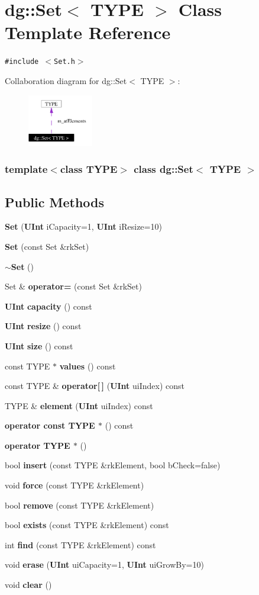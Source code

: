 \section{dg::Set$<$ TYPE $>$ Class Template Reference}
\label{classdg_1_1Set}
{\tt \#include $<$Set.h$>$}

Collaboration diagram for dg::Set$<$ TYPE $>$:\begin{figure}[H]
\begin{center}
\leavevmode
\includegraphics[width=81pt]{classdg_1_1Set__coll__graph}
\end{center}
\end{figure}
\subsubsection*{template$<$class TYPE$>$ class dg::Set$<$ TYPE $>$}

\subsection*{Public Methods}
\begin{CompactItemize}
\item 
{\bf Set} ({\bf UInt} i\-Capacity=1, {\bf UInt} i\-Resize=10)
\item 
{\bf Set} (const Set \&rk\-Set)
\item 
{\bf $\sim$Set} ()
\item 
Set \& {\bf operator=} (const Set \&rk\-Set)
\item 
{\bf UInt} {\bf capacity} () const
\item 
{\bf UInt} {\bf resize} () const
\item 
{\bf UInt} {\bf size} () const
\item 
const TYPE $\ast$ {\bf values} () const
\item 
const TYPE \& {\bf operator[$\,$]} ({\bf UInt} ui\-Index) const
\item 
TYPE \& {\bf element} ({\bf UInt} ui\-Index) const
\item 
{\bf operator const TYPE $\ast$} () const
\item 
{\bf operator TYPE $\ast$} ()
\item 
bool {\bf insert} (const TYPE \&rk\-Element, bool b\-Check=false)
\item 
void {\bf force} (const TYPE \&rk\-Element)
\item 
bool {\bf remove} (const TYPE \&rk\-Element)
\item 
bool {\bf exists} (const TYPE \&rk\-Element) const
\item 
int {\bf find} (const TYPE \&rk\-Element) const
\item 
void {\bf erase} ({\bf UInt} ui\-Capacity=1, {\bf UInt} ui\-Grow\-By=10)
\item 
void {\bf clear} ()
\end{CompactItemize}
